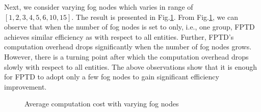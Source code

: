 \documentclass[conference,a4paper]{IEEEtran}
\begin{document}
    Next, we consider varying fog nodes which varies in range of $[1,2,3,4,5,6,10,15]$. The result is presented in Fig.\ref{fogs}. From Fig.\ref{fogs}, we can observe that when the number of fog nodes is set to only, i.e., one group, FPTD achieves similar efficiency as \cite{rtpt} with respect to all entities. Further, FPTD's computation overhead drops significantly when the number of fog nodes grows. However, there is a turning point after which the computation overhead drops slowly with respect to all entities. The above observations show that it is enough for FPTD to adopt only a few fog nodes to gain significant efficiency improvement.
    \begin{figure}[!ht]
        \centering
        \caption{Average computation cost with varying fog nodes}
        \label{fogs}
    \end{figure}
\end{document}
